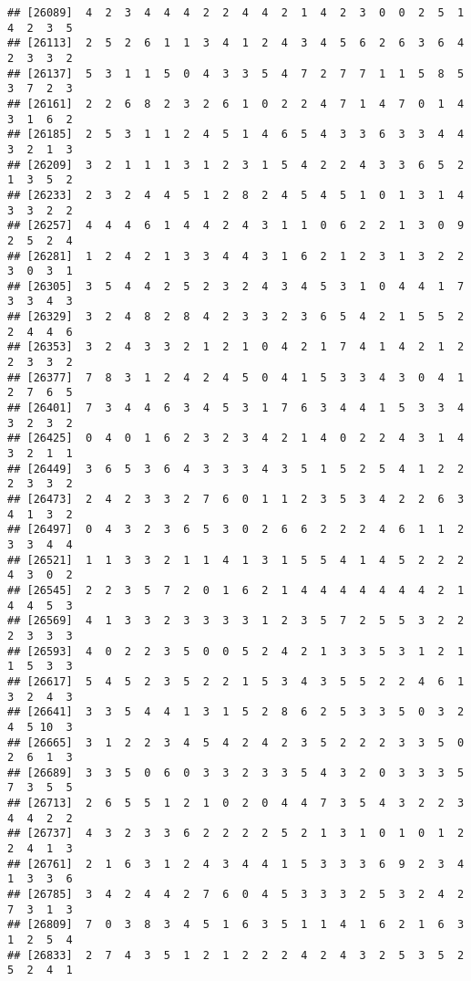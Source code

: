 \documentclass[
]{article}
\begin{document}
\begin{verbatim}
## [26089]  4  2  3  4  4  4  2  2  4  4  2  1  4  2  3  0  0  2  5  1  4  2  3  5
## [26113]  2  5  2  6  1  1  3  4  1  2  4  3  4  5  6  2  6  3  6  4  2  3  3  2
## [26137]  5  3  1  1  5  0  4  3  3  5  4  7  2  7  7  1  1  5  8  5  3  7  2  3
## [26161]  2  2  6  8  2  3  2  6  1  0  2  2  4  7  1  4  7  0  1  4  3  1  6  2
## [26185]  2  5  3  1  1  2  4  5  1  4  6  5  4  3  3  6  3  3  4  4  3  2  1  3
## [26209]  3  2  1  1  1  3  1  2  3  1  5  4  2  2  4  3  3  6  5  2  1  3  5  2
## [26233]  2  3  2  4  4  5  1  2  8  2  4  5  4  5  1  0  1  3  1  4  3  3  2  2
## [26257]  4  4  4  6  1  4  4  2  4  3  1  1  0  6  2  2  1  3  0  9  2  5  2  4
## [26281]  1  2  4  2  1  3  3  4  4  3  1  6  2  1  2  3  1  3  2  2  3  0  3  1
## [26305]  3  5  4  4  2  5  2  3  2  4  3  4  5  3  1  0  4  4  1  7  3  3  4  3
## [26329]  3  2  4  8  2  8  4  2  3  3  2  3  6  5  4  2  1  5  5  2  2  4  4  6
## [26353]  3  2  4  3  3  2  1  2  1  0  4  2  1  7  4  1  4  2  1  2  2  3  3  2
## [26377]  7  8  3  1  2  4  2  4  5  0  4  1  5  3  3  4  3  0  4  1  2  7  6  5
## [26401]  7  3  4  4  6  3  4  5  3  1  7  6  3  4  4  1  5  3  3  4  3  2  3  2
## [26425]  0  4  0  1  6  2  3  2  3  4  2  1  4  0  2  2  4  3  1  4  3  2  1  1
## [26449]  3  6  5  3  6  4  3  3  3  4  3  5  1  5  2  5  4  1  2  2  2  3  3  2
## [26473]  2  4  2  3  3  2  7  6  0  1  1  2  3  5  3  4  2  2  6  3  4  1  3  2
## [26497]  0  4  3  2  3  6  5  3  0  2  6  6  2  2  2  4  6  1  1  2  3  3  4  4
## [26521]  1  1  3  3  2  1  1  4  1  3  1  5  5  4  1  4  5  2  2  2  4  3  0  2
## [26545]  2  2  3  5  7  2  0  1  6  2  1  4  4  4  4  4  4  4  2  1  4  4  5  3
## [26569]  4  1  3  3  2  3  3  3  3  1  2  3  5  7  2  5  5  3  2  2  2  3  3  3
## [26593]  4  0  2  2  3  5  0  0  5  2  4  2  1  3  3  5  3  1  2  1  1  5  3  3
## [26617]  5  4  5  2  3  5  2  2  1  5  3  4  3  5  5  2  2  4  6  1  3  2  4  3
## [26641]  3  3  5  4  4  1  3  1  5  2  8  6  2  5  3  3  5  0  3  2  4  5 10  3
## [26665]  3  1  2  2  3  4  5  4  2  4  2  3  5  2  2  2  3  3  5  0  2  6  1  3
## [26689]  3  3  5  0  6  0  3  3  2  3  3  5  4  3  2  0  3  3  3  5  7  3  5  5
## [26713]  2  6  5  5  1  2  1  0  2  0  4  4  7  3  5  4  3  2  2  3  4  4  2  2
## [26737]  4  3  2  3  3  6  2  2  2  2  5  2  1  3  1  0  1  0  1  2  2  4  1  3
## [26761]  2  1  6  3  1  2  4  3  4  4  1  5  3  3  3  6  9  2  3  4  1  3  3  6
## [26785]  3  4  2  4  4  2  7  6  0  4  5  3  3  3  2  5  3  2  4  2  7  3  1  3
## [26809]  7  0  3  8  3  4  5  1  6  3  5  1  1  4  1  6  2  1  6  3  1  2  5  4
## [26833]  2  7  4  3  5  1  2  1  2  2  2  4  2  4  3  2  5  3  5  2  5  2  4  1

\end{verbatim}
\end{document}
